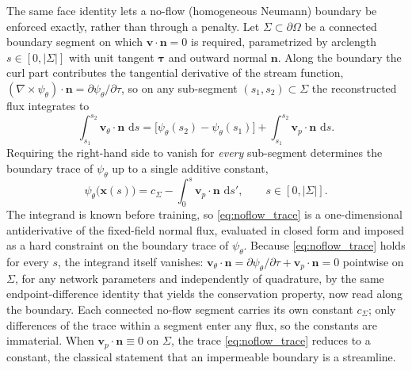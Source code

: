 \documentclass[a4paper,fleqn]{cas-sc}
\newcommand{\dd}{\,\mathrm{d}}
\newcommand{\vflux}{\mathbf{v}}
\newcommand{\curl}{\nabla\times}          %
\newcommand{\vp}{\vflux_{p}}              %
\begin{document}
The same face identity lets a no-flow (homogeneous Neumann) boundary be enforced
exactly, rather than through a penalty. Let \(\Sigma\subset\partial\Omega\) be a
connected boundary segment on which \(\vflux\cdot\mathbf{n}=0\) is required,
parametrized by arclength \(s\in[0,|\Sigma|]\) with unit tangent \(\bm\tau\) and
outward normal \(\mathbf{n}\). Along the boundary the curl part contributes the
tangential derivative of the stream function,
\((\curl\psi_\theta)\cdot\mathbf{n}=\partial\psi_\theta/\partial\tau\), so on any
sub-segment \((s_1,s_2)\subset\Sigma\) the reconstructed flux integrates to
\[
  \int_{s_1}^{s_2}\vflux_\theta\cdot\mathbf{n}\,\dd s
  =
  \bigl[\psi_\theta(s_2)-\psi_\theta(s_1)\bigr]
  +\int_{s_1}^{s_2}\vp\cdot\mathbf{n}\,\dd s .
\]
Requiring the right-hand side to vanish for \emph{every} sub-segment determines
the boundary trace of \(\psi_\theta\) up to a single additive constant,
\begin{equation}
  \psi_\theta\bigl(\mathbf{x}(s)\bigr)
  = c_\Sigma-\int_0^{s}\vp\cdot\mathbf{n}\,\dd s',
  \qquad s\in[0,|\Sigma|].
  \label{eq:noflow_trace}
\end{equation}
The integrand is known before training, so \eqref{eq:noflow_trace} is a
one-dimensional antiderivative of the fixed-field normal flux, evaluated in
closed form and imposed as a hard constraint on the boundary trace of
\(\psi_\theta\). Because \eqref{eq:noflow_trace} holds for every \(s\), the
integrand itself vanishes:
\(\vflux_\theta\cdot\mathbf{n}
=\partial\psi_\theta/\partial\tau+\vp\cdot\mathbf{n}=0\) pointwise on
\(\Sigma\), for any network parameters and independently of quadrature, by
the same endpoint-difference identity that yields the conservation property,
now read along the boundary. Each connected no-flow segment carries its own
constant \(c_\Sigma\); only differences of the trace within a segment enter any
flux, so the constants are immaterial. When \(\vp\cdot\mathbf{n}\equiv0\) on
\(\Sigma\), the trace \eqref{eq:noflow_trace} reduces to a constant, the
classical statement that an impermeable boundary is a streamline.
\end{document}
